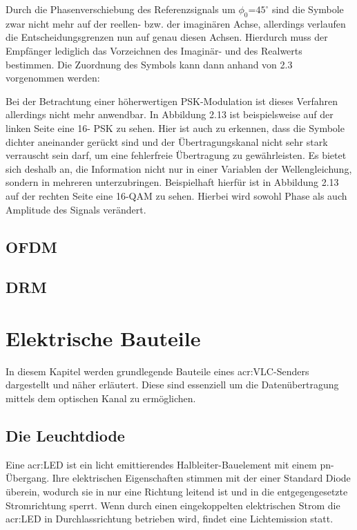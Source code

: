 Durch die Phasenverschiebung des Referenzsignals um $\phi_0$=$45^\circ$ sind die Symbole zwar
nicht mehr auf der reellen- bzw. der imaginären Achse, allerdings verlaufen die Entscheidungsgrenzen nun auf genau diesen Achsen. Hierdurch muss der Empfänger lediglich das Vorzeichnen des Imaginär- und des Realwerts bestimmen. Die Zuordnung des Symbols kann dann anhand von 2.3 vorgenommen werden:



Bei der Betrachtung einer höherwertigen PSK-Modulation ist dieses Verfahren allerdings
nicht mehr anwendbar. In Abbildung 2.13 ist beispielsweise auf der linken Seite eine 16-
PSK zu sehen. Hier ist auch zu erkennen, dass die Symbole dichter aneinander gerückt
sind und der Übertragungskanal nicht sehr stark verrauscht sein darf, um eine fehlerfreie
Übertragung zu gewährleisten. Es bietet sich deshalb an, die Information nicht nur in einer
Variablen der Wellengleichung, sondern in mehreren unterzubringen. Beispielhaft hierfür
ist in Abbildung 2.13 auf der rechten Seite eine 16-QAM zu sehen. Hierbei wird sowohl
Phase als auch Amplitude des Signals verändert.
\subsection{OFDM}
\label{subsec:Unterabschnitt1}
\subsection{DRM}
\label{subsec:Unterabschnitt1}

\section{Elektrische Bauteile}
\label{subsec:Unterabschnitt1}
In diesem Kapitel werden grundlegende Bauteile eines \gls{acr:VLC}-Senders dargestellt und näher erläutert. Diese sind essenziell um die Datenübertragung mittels dem optischen Kanal zu ermöglichen.

\subsection{Die Leuchtdiode}
\label{sub:led}


Eine \gls{acr:LED} ist ein licht emittierendes Halbleiter-Bauelement mit einem pn-Übergang. Ihre elektrischen Eigenschaften stimmen mit der einer Standard Diode überein, wodurch sie in nur eine Richtung leitend ist und in die entgegengesetzte Stromrichtung sperrt. Wenn durch einen eingekoppelten elektrischen Strom die \gls{acr:LED} in Durchlassrichtung betrieben wird, findet eine Lichtemission statt.\cite{slabke} 

